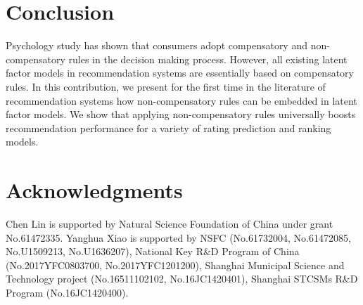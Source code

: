 \documentclass[letterpaper]{article} %
\begin{document}
\section{Conclusion}\label{sec:conclusion}
Psychology study has shown that consumers adopt compensatory and non-compensatory rules in the decision making process. However, all existing latent factor models in recommendation systems are essentially based on compensatory rules. In this contribution, we present for the first time in the literature of recommendation systems how non-compensatory rules can be embedded in latent factor models. We show that applying non-compensatory rules universally boosts recommendation performance for a variety of rating prediction and ranking models. 

\section{ Acknowledgments}
Chen Lin is supported by Natural Science Foundation of China under grant No.61472335. Yanghua Xiao is supported by NSFC (No.61732004, No.61472085, No.U1509213, No.U1636207), National Key R\&D Program of China (No.2017YFC0803700, No.2017YFC1201200), Shanghai Municipal Science and Technology project (No.16511102102, No.16JC1420401), Shanghai STCSMs R\&D Program (No.16JC1420400).

%
\end{document}
